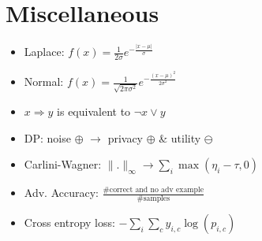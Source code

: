 \section{Miscellaneous}
\begin{itemize}
  \item Laplace: $f(x)=\frac{1}{2\sigma}e^{-\frac{|x-\mu|}{\sigma}}$
  \item Normal: $f(x)=\frac{1}{\sqrt{2\pi\sigma^2}}e^{-\frac{(x-\mu)^2}{2\sigma^2}}$
  \item $x\Rightarrow y$ is equivalent to $\neg x \lor y$
  \item DP: noise $\oplus$ $\rightarrow$ privacy $\oplus$ \& utility $\ominus$
  \item Carlini-Wagner: $\|.\|_{\infty}\rightarrow\sum_i \max(\eta_i-\tau,0)$
  \item Adv. Accuracy: $\frac{\#\text{correct and no adv example}}{\#\text{samples}}$
  \item Cross entropy loss: $-\sum_i\sum_c y_{i,c}\log(p_{i,c})$
\end{itemize}
